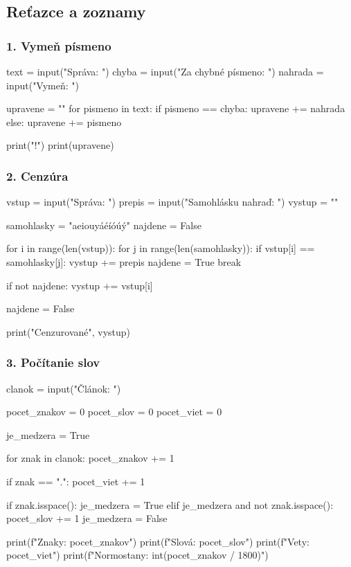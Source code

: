 \subsection{Reťazce a zoznamy}

\subsubsection*{1. Vymeň písmeno}
\begin{solution}
text = input("Správa: ")
chyba = input("Za chybné písmeno: ")
nahrada = input("Vymeň: ")

upravene = ""
for pismeno in text:
    if pismeno == chyba:
        upravene += nahrada
    else:
        upravene += pismeno

print("!")
print(upravene)
\end{solution}


\subsubsection*{2. Cenzúra}
\begin{solution}
vstup = input("Správa: ")
prepis = input("Samohlásku nahraď: ")
vystup = ""

samohlasky = "aeiouyáéíóúý"
najdene = False

for i in range(len(vstup)):
    for j in range(len(samohlasky)):
        if vstup[i] == samohlasky[j]:
            vystup += prepis
            najdene = True
            break

    if not najdene:
        vystup += vstup[i]

    najdene = False

print("Cenzurované", vystup)
\end{solution}

\subsubsection*{3. Počítanie slov}
\begin{solution}
clanok = input("Článok: ")

pocet_znakov = 0
pocet_slov = 0
pocet_viet = 0

je_medzera = True

for znak in clanok:
    pocet_znakov += 1

    if znak == ".":
        pocet_viet += 1

    if znak.isspace():
        je_medzera = True
    elif je_medzera and not znak.isspace():
        pocet_slov += 1
        je_medzera = False


print(f"Znaky: {pocet_znakov}")
print(f"Slová: {pocet_slov}")
print(f"Vety: {pocet_viet}")
print(f"Normostany: {int(pocet_znakov / 1800)}")
\end{solution}


